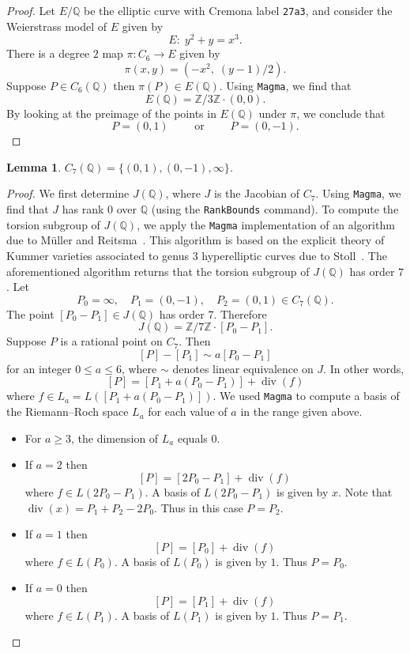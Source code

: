 \documentclass{amsart}
\newtheorem{lem}[thm]{Lemma}
\theoremstyle{definition}
\newcommand{\Z}{\mathbb{Z}}
\newcommand{\Q}{\mathbb{Q}}
\DeclareMathOperator{\divv}{div}
\begin{document}
\begin{proof}
    Let $E/\Q$ be the elliptic curve with Cremona label \texttt{27a3}, and consider the Weierstrass model of $E$ given by 
    \[
    E:\; y^2 + y = x^3.
    \]
    There is a degree $2$ map $\pi: C_6\rightarrow E$ given by 
    \[
    \pi(x,y) = (-x^2,\; (y-1)/2).
    \]
    Suppose $P\in C_6(\Q)$ then $\pi(P)\in E(\Q)$.
    Using \texttt{Magma}, we find that 
    \[
    E(\Q) = \Z/3\Z\cdot (0,0).
    \]
    By looking at the preimage of the points in $E(\Q)$ under $\pi$, we conclude that 
    \[
    P = (0,1) \qquad \text{ or } \qquad P= (0,-1).
    \]
\end{proof}

\begin{lem}\label{lem:C7rational}
    $C_{7}(\Q)=\{(0,1), (0,-1), \infty\}$.
\end{lem}

\begin{proof}
    We first determine $J(\Q)$, where $J$ is the Jacobian of $C_7$. Using \texttt{Magma}, we find that $J$ has rank $0$ over $\Q$ (using the \texttt{RankBounds} command). To compute the torsion subgroup of $J(\Q)$, we apply the \texttt{Magma} implementation of an algorithm due to M\"{u}ller and Reitsma~\cite{Muller}. This algorithm is based on the explicit theory of Kummer varieties associated to genus $3$ hyperelliptic curves due to Stoll~\cite{Stoll17}. The aforementioned algorithm returns that the torsion subgroup of $J(\Q)$ has order $7$. Let 
    \[
    P_0=\infty,\quad P_1=(0,-1),\quad P_2=(0,1)\in C_7(\Q).
    \]
    The point $[P_0-P_1]\in J(\Q)$ has order 7. 
    Therefore
    \[
    J(\Q)=\Z/7\Z\cdot [P_0-P_1].
    \]
    Suppose $P$ is a rational point on $C_7$. 
    Then
    \[
        [P]-[P_1] \sim a[P_0-P_1]
    \]
    for an integer $0\leq a\leq 6$, where $\sim$ denotes linear equivalence on $J$. In other words,
    \[
    [P] = [P_1 + a(P_0-P_1)] + \divv(f)
    \]
    where $f\in L_a=L([P_1+ a(P_0-P_1)])$. We used \texttt{Magma} to compute a basis of the Riemann--Roch space $L_a$ for each value of $a$ in the range given above. 
    \begin{itemize}
    \item For $a\geq 3$, the dimension of $L_a$ equals $0$.
    \item 
    If $a=2$ then 
    \[
    [P] = [2P_0-P_1] + \divv(f)
    \]
    where $f\in L(2P_0-P_1)$. A basis of $L(2P_0-P_1)$ is given by $x$. Note that $\divv(x)=P_1+P_2-2P_0$. Thus in this case $P=P_2$.
    \item 
    If $a=1$ then 
    \[
    [P]=[P_0]+\divv(f)
    \]
    where $f\in L(P_0)$. A basis of $L(P_0)$ is given by $1$. Thus $P=P_0$.
    \item If $a=0$ then
    \[
    [P]=[P_1] +\divv(f)
    \]
    where $f\in L(P_1)$.
    A basis of $L(P_1)$ is given by $1$. Thus $P=P_1$.
    \end{itemize}
\end{proof}
\end{document}
